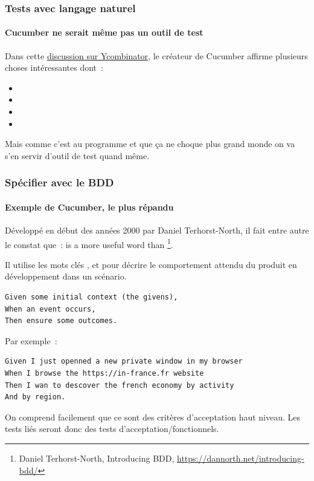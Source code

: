\documentclass{beamer}
\begin{document}
    \begin{frame}
        \frametitle{Tests avec langage naturel}
        \framesubtitle{Cucumber ne serait même pas un outil de test}
        \transdissolve
        Dans cette \href{https://news.ycombinator.com/item?id=10194242}{discussion sur Ycombinator}, le créateur de Cucumber affirme plusieurs choses intéressantes dont~:
        \begin{itemize}
            \item {}
            \item {}
            \item {}
            \item {}
        \end{itemize}
        Mais comme c'est au programme et que ça ne choque plus grand monde on va s'en servir d'outil de test quand même. 
    \end{frame}

    \begin{frame}[fragile]
        \frametitle{Spécifier avec le BDD}
        \framesubtitle{Exemple de Cucumber, le plus répandu}
        \transdissolve
        Développé en début des années 2000 par Daniel Terhorst-North, il fait entre autre le constat que~:  is a more useful word than \footnote{Daniel Terhorst-North, Introducing BDD, \url{https://dannorth.net/introducing-bdd/}}.

        Il utilise les mots clés ,  et  pour décrire le comportement attendu du produit en développement dans un scénario.
        \begin{lstlisting}
Given some initial context (the givens),
When an event occurs,
Then ensure some outcomes.
        \end{lstlisting}
        Par exemple~:
        \begin{lstlisting}
Given I just openned a new private window in my browser
When I browse the https://in-france.fr website
Then I wan to descover the french economy by activity
And by region.
        \end{lstlisting}
        On comprend facilement que ce sont des critères d'acceptation haut niveau.
        Les tests liés seront donc des tests d'acceptation/fonctionnels.
    \end{frame}
\end{document}
